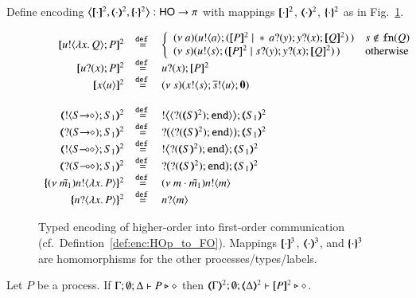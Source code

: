 \begin{definition}\rm
\label{def:enc:HOp_to_FO}
	Define encoding
	$\enco{\map{\cdot}^2, \mapt{\cdot}^2, \mapa{\cdot}^2}: \HO \to \sessp$
	with mappings 
	$[\!\![\cdot]\!\!]^{2}$, $(\!\!\langle\cdot\rangle\!\!)^{2}$, $\{\!\!\{\cdot\}\!\!\}^{2}$ as
	in Fig.~\ref{fig:enc:HOp_to_FO}.
\end{definition}
%
\begin{figure}[t]
	\[
	\begin{array}{rcl}
		\pmap{\bout{u}{\abs{x}{Q}} P}{2} & \defeq &  \left\{
		\begin{array}{ll}
			\newsp{a}{\bout{u}{a} (\pmap{P}{2} \Par \repl{} \binp{a}{y} \binp{y}{x} \pmap{Q}{2})\,} & s \notin \fn{Q} \\
			\newsp{s}{\bout{u}{s} (\pmap{P}{2} \Par \binp{s}{y} \binp{y}{x} \pmap{Q}{2})\,} & \textrm{otherwise} %
		\end{array}
		\right.
		\\
		\pmap{\binp{u}{x} P}{2} &\defeq&  \binp{u}{x} \pmap{P}{2}\\
		\pmap{\appl{x}{u}}{2} & \defeq & \newsp{s}{\bout{x}{s} \bout{\dual{s}}{u} \inact}
		\\
		\\
		\tmap{\btout{\shot{S}}S_1}{2} & \defeq & \bbtout{\chtype{\btinp{\tmap{S}{2}}\tinact}}\tmap{S_1}{2} \\
		\tmap{\btinp{\shot{S}}S_1}{2} & \defeq & \bbtinp{\chtype{\btinp{\tmap{S}{2}}\tinact}}\tmap{S_1}{2} \\

		\tmap{\btout{\lhot{S}}S_1}{2} & \defeq & \bbtout{\btinp{\tmap{S}{2}}\tinact}\tmap{S_1}{2} \\
		\tmap{\btinp{\lhot{S}}S_1}{2} & \defeq & \bbtinp{\btinp{\tmap{S}{2}}\tinact}\tmap{S_1}{2} \\
		\mapa{\news{\tilde{m_1}}\bactout{n}{\abs{ x}{P}} }^{2} &  \defeq & \news{m \cdot \tilde{m_1}} \bactout{n}{m} \\
		\mapa{\bactinp{n}{\abs{ x}{P}} }^{2} &  \defeq & \bactinp{n}{m}
	\end{array}
	\]
	\caption{
		Typed encoding of higher-order  into first-order communication (cf.~Defintion~\ref{def:enc:HOp_to_FO}).
		\label{fig:enc:HOp_to_FO}
		Mappings 
		$[\!\![\cdot]\!\!]^3$,
		$(\!\!\langle\cdot\rangle\!\!)^3$, 
		and 
		$\{\!\!\{\cdot\}\!\!\}^3$
		are homomorphisms for the other processes/types/labels. 
	}
\end{figure}


\begin{proposition}\rm
\label{prop:typepres_HOp_to_FO}
	Let $P$ be a \HOp process. 
	If $\Gamma; \emptyset; \Delta \vdash P \triangleright \diamond$ then 
	$\mapt{\Gamma}^{2}; \emptyset; \mapt{\Delta}^{2} \proves \map{P}^{2} \hastype \Proc$.
\end{proposition}

